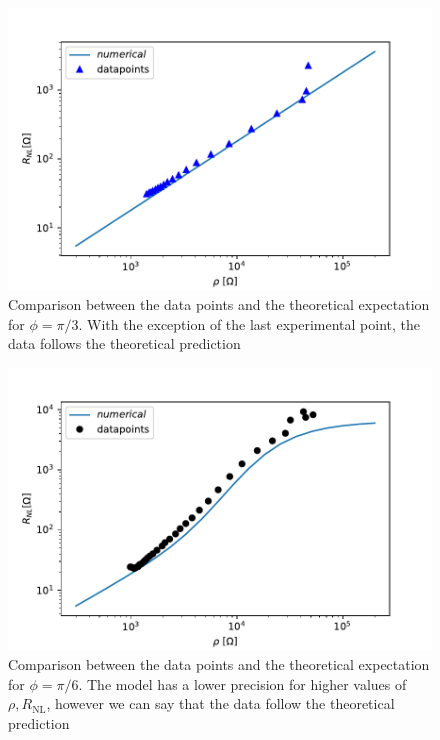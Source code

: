 \begin{figure}[h!]
    \centering
    \includegraphics[width=\linewidth]{Immagini/rnl/rebecca_0.pdf}
    \caption{Comparison between the data points and the theoretical expectation for $\phi=\pi/3$. With the exception of the last experimental point, the data follows the theoretical prediction}
    \label{fig:rebecca pi/3}
\end{figure}
\begin{figure}[h!]
    \centering
    \includegraphics[width=\linewidth]{Immagini/rnl/rebecca_1.pdf}
    \caption{Comparison between the data points and the theoretical expectation for $\phi=\pi/6$. The model has a lower precision for higher values of $\rho,R_{\textrm{NL}}$, however we can say that the data follow the theoretical prediction}
    \label{fig:rebecca pi/6}
\end{figure}
